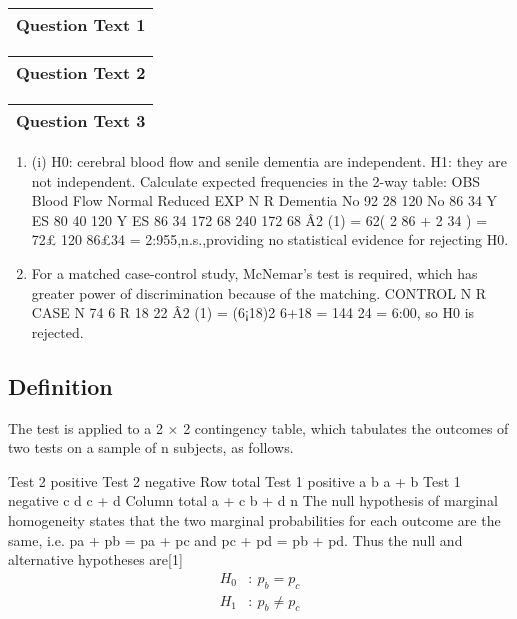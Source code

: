 \documentclass[a4paper,12pt]{article}
\begin{document}
\maketitle

  \begin{table}[ht!]
     \centering
     \begin{tabular}{|p{15cm}|}
     \hline        
Question Text 1
\\ \hline
      \end{tabular}
    \end{table}
    
  \begin{table}[ht!]
     \centering
     \begin{tabular}{|p{15cm}|}
     \hline  
Question Text 2   
 \\ \hline 
      \end{tabular}
    \end{table}
  \begin{table}[ht!]
     \centering
     \begin{tabular}{|p{15cm}|}
     \hline  
Question Text 3 
\\ \hline
      \end{tabular}
    \end{table}
        \begin{enumerate}
    \item (i) H0: cerebral blood flow and senile dementia are independent.
H1: they are not independent.
Calculate expected frequencies in the 2-way table:
OBS Blood Flow Normal Reduced EXP N R
Dementia No 92 28 120 No 86 34
Y ES 80 40 120 Y ES 86 34
172 68 240 172 68
Â2
(1) = 62( 2
86 + 2
34 ) = 72£ 120
86£34 = 2:955,n.s.,providing no statistical evidence for rejecting
H0.
\item  For a matched case-control study, McNemar’s test is required, which has greater power
of discrimination because of the matching.
CONTROL
N R
CASE N 74 6
R 18 22
Â2
(1) = (6¡18)2
6+18 = 144
24 = 6:00, so H0 is rejected.
\end{enumerate}
\subsection*{Definition}
The test is applied to a 2 × 2 contingency table, which tabulates the outcomes of two tests on a sample of n subjects, as follows. 

Test 2 positive
Test 2 negative
Row total 
Test 1 positive
a
b
a + b 
Test 1 negative
c
d
c + d 
Column total
a + c
b + d
n 
The null hypothesis of marginal homogeneity states that the two marginal probabilities for each outcome are the same, i.e. pa + pb = pa + pc and pc + pd = pb + pd. 
Thus the null and alternative hypotheses are[1] 
\[{\displaystyle {\begin{aligned}H_{0}&:~p_{b}=p_{c}\\H_{1}&:~p_{b}\neq p_{c}\end{aligned}}} \]
\end{document}
